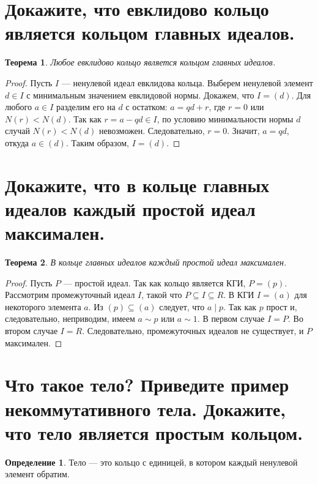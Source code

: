\documentclass[12pt, a4paper]{article}
\theoremstyle{definition}
\newtheorem{definition}{Определение}[section]
\theoremstyle{plain}
\newtheorem{theorem}{Теорема}[section]
\begin{document}
	\newpage
	\section{Докажите, что евклидово кольцо является кольцом главных идеалов.}
	
	\begin{theorem}
		Любое евклидово кольцо является кольцом главных идеалов.
	\end{theorem}
	\begin{proof}
		Пусть $I$ — ненулевой идеал евклидова кольца. Выберем ненулевой элемент $d \in I$ с минимальным значением евклидовой нормы. Докажем, что $I = (d)$.
		Для любого $a \in I$ разделим его на $d$ с остатком: $a = qd + r$, где $r=0$ или $N(r) < N(d)$. Так как $r = a - qd \in I$, по условию минимальности нормы $d$ случай $N(r) < N(d)$ невозможен. Следовательно, $r=0$. Значит, $a = qd$, откуда $a \in (d)$. Таким образом, $I = (d)$.
	\end{proof}
	
	\newpage
	\section{Докажите, что в кольце главных идеалов каждый простой идеал максимален.}
	
	\begin{theorem}
		В кольце главных идеалов каждый простой идеал максимален.
	\end{theorem}
	\begin{proof}
		Пусть $P$ — простой идеал. Так как кольцо является КГИ, $P = (p)$. Рассмотрим промежуточный идеал $I$, такой что $P \subseteq I \subseteq R$. В КГИ $I = (a)$ для некоторого элемента $a$.
		Из $(p) \subseteq (a)$ следует, что $a \mid p$. Так как $p$ прост и, следовательно, неприводим, имеем $a \sim p$ или $a \sim 1$. 
		В первом случае $I = P$. Во втором случае $I = R$. Следовательно, промежуточных идеалов не существует, и $P$ максимален.
	\end{proof}
	
	\newpage
	\setcounter{section}{40}
	\section{Что такое тело? Приведите пример некоммутативного тела. Докажите, что тело является простым кольцом.}
	
	\begin{definition}
		Тело — это кольцо с единицей, в котором каждый ненулевой элемент обратим.
	\end{definition}
	
\end{document}
